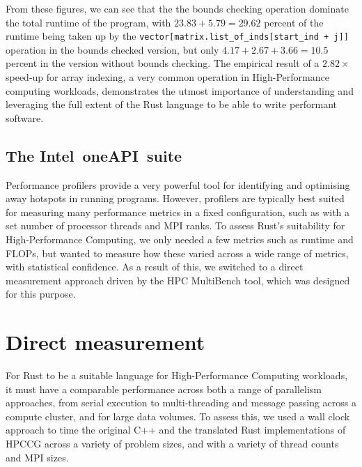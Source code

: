 From these figures, we can see that the the bounds checking operation dominate the total runtime of the program, with $23.83 + 5.79 = 29.62$ percent of the runtime being taken up by the \texttt{vector[matrix.list_of_inds[start_ind + j]]} operation in the bounds checked version, but only $4.17 + 2.67 + 3.66 = 10.5$ percent in the version without bounds checking. The empirical result of a $2.82\times$ speed-up for array indexing, a very common operation in High-Performance computing workloads, demonstrates the utmost importance of understanding and leveraging the full extent of the Rust language to be able to write performant software.



\subsection{The Intel\textregistered\ oneAPI\texttrademark\ suite}
\label{ssec:perf profiler}


Performance profilers provide a very powerful tool for identifying and optimising away hotspots in running programs. However, profilers are typically best suited for measuring many performance metrics in a fixed configuration, such as with a set number of processor threads and MPI ranks. To assess Rust's suitability for High-Performance Computing, we only needed a few metrics such as runtime and FLOPs, but wanted to measure how these varied across a wide range of metrics, with statistical confidence. As a result of this, we switched to a direct measurement approach driven by the HPC MultiBench tool, which was designed for this purpose.

\section{Direct measurement}
\label{sec:direct-measurement} %

For Rust to be a suitable language for High-Performance Computing workloads, it must have a comparable performance across both a range of parallelism approaches, from serial execution to multi-threading and message passing across a compute cluster, and for large data volumes. To assess this, we used a wall clock approach to time the original C++ and the translated Rust implementations of HPCCG across a variety of problem sizes, and with a variety of thread counts and MPI sizes.

